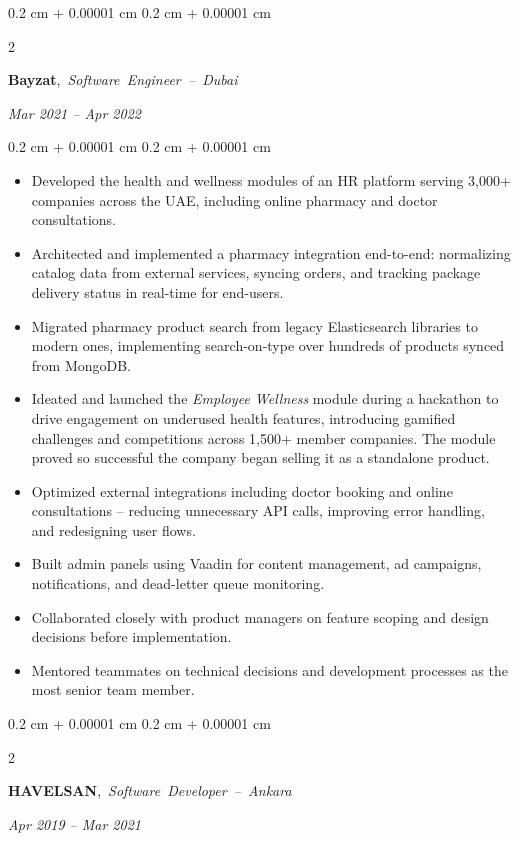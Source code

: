\documentclass[10pt, letterpaper]{article}
\newenvironment{highlights}{
    \begin{itemize}[
        topsep=0.10 cm,
        parsep=0.10 cm,
        partopsep=0pt,
        itemsep=0pt,
        leftmargin=0.4 cm + 10pt
    ]
}{
    \end{itemize}
} %
\newenvironment{onecolentry}{
    \begin{adjustwidth}{
        0.2 cm + 0.00001 cm
    }{
        0.2 cm + 0.00001 cm
    }
}{
    \end{adjustwidth}
} %
\newenvironment{twocolentry}[2][]{
    \onecolentry
    \def\secondColumn{#2}
    \setcolumnwidth{\fill, 4.5 cm}
    \begin{paracol}{2}
}{
    \switchcolumn \raggedleft \secondColumn
    \end{paracol}
    \endonecolentry
} %
\begin{document}
        \vspace{0.35 cm}

        \begin{twocolentry}{
        \textit{Mar 2021 – Apr 2022}}
            \mbox{\textbf{Bayzat},
            \textit{Software Engineer -- Dubai}
            }
        \end{twocolentry}

        \vspace{0.10 cm}
        \begin{onecolentry}
            \begin{highlights}
\item Developed the health and wellness modules of an HR platform serving 3,000+ companies across the UAE, including online pharmacy and doctor consultations.
\item Architected and implemented a pharmacy integration end-to-end: normalizing catalog data from external services, syncing orders, and tracking package delivery status in real-time for end-users.
\item Migrated pharmacy product search from legacy Elasticsearch libraries to modern ones, implementing search-on-type over hundreds of products synced from MongoDB.
\item Ideated and launched the \textit{Employee Wellness} module during a hackathon to drive engagement on underused health features, introducing gamified challenges and competitions across 1,500+ member companies. The module proved so successful the company began selling it as a standalone product.
\item Optimized external integrations including doctor booking and online consultations -- reducing unnecessary API calls, improving error handling, and redesigning user flows.
\item Built admin panels using Vaadin for content management, ad campaigns, notifications, and dead-letter queue monitoring.
\item Collaborated closely with product managers on feature scoping and design decisions before implementation.
\item Mentored teammates on technical decisions and development processes as the most senior team member.
            \end{highlights}
        \end{onecolentry}

        \vspace{0.35 cm}

        \begin{twocolentry}{
        \textit{Apr 2019 – Mar 2021}}
            \mbox{\textbf{HAVELSAN},
            \textit{Software Developer -- Ankara}
            }
        \end{twocolentry}
\end{document}

